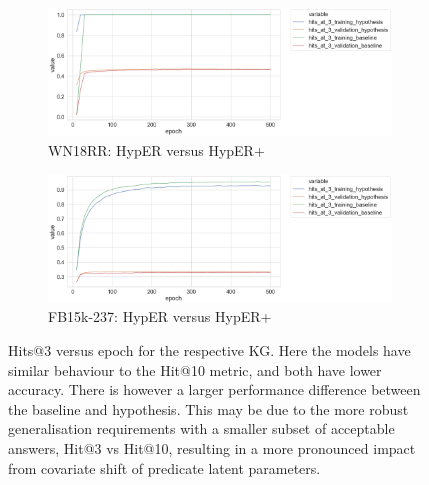 
\begin{figure}[H]
	\begin{subfigure}[b]{.5\linewidth}
   		\centering
    		\includegraphics[width=1.0\linewidth, height=0.6\linewidth]{WN18RR_hits_at_3_Results}
		\captionsetup{justification=centering}
		\caption{WN18RR: HypER versus HypER+}
	\end{subfigure}
	\begin{subfigure}[b]{.5\linewidth}
   		\centering
		\includegraphics[width=1.0\linewidth, height=0.6\linewidth]{FB15k-237_hits_at_3_Results}
		\captionsetup{justification=centering}
		\caption{FB15k-237: HypER versus HypER+}
	\end{subfigure}
	\captionsetup{justification=centering}
	\caption{Hits@3 versus epoch for the respective KG. Here the models have similar behaviour to the Hit@10 metric, and both have lower accuracy. There is however a larger performance difference between the baseline and hypothesis. This may be due to the more robust generalisation requirements with a smaller subset of acceptable answers, Hit@3 vs Hit@10, resulting in a more pronounced impact from covariate shift of predicate latent parameters.}
\end{figure}

